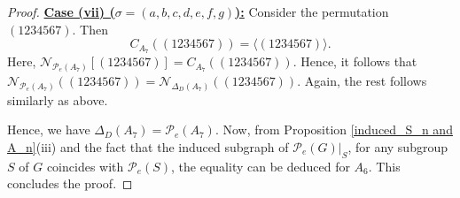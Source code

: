 \documentclass[10pt,a4paper]{amsart}
\begin{document}
\begin{proof}
\vspace{.3cm}
\noindent\underline{\bf{Case (vii) ($\sigma=(a,b,c,d,e,f,g)$):}} Consider the permutation $(1234567)$. Then \[C_{A_7}((1234567))=\langle(1234567)\rangle.\] Here, $\mathcal{N}_{\mathcal{P}_e(A_7)}[(1234567)]=C_{A_7}((1234567))$. Hence, it follows that $\mathcal{N}_{\mathcal{P}_e(A_7)}((1234567))=\mathcal{N}_{\Delta_D(A_7)}((1234567))$. Again, the rest follows similarly as above.

Hence, we have $\Delta_D(A_7)=\mathcal{P}_e(A_7)$. Now, from Proposition \ref{induced_S_n and A_n}(iii) and the fact that the induced subgraph of $\mathcal{P}_e(G)\vert_S$, for any subgroup $S$ of $G$ coincides with $\mathcal{P}_e(S)$, the equality can be deduced for $A_6$. This concludes the proof. 
\end{proof}
\end{document}
